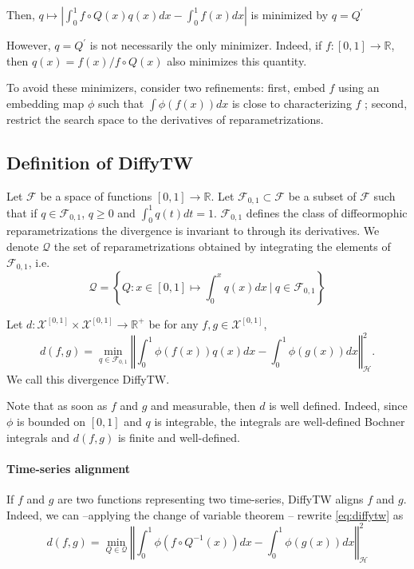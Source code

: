 Then,
$q \mapsto \left\vert\int_0^1 f\circ Q(x)q(x) dx - \int_0^1 f(x)dx\right\vert$
is minimized by $q=Q^\prime$

However, $q=Q^\prime$ is not necessarily the only minimizer. Indeed, if $f:[0,1] \to \mathbb R$, then $q(x) = f(x) / f\circ Q(x)$ also minimizes this quantity.

To avoid these minimizers, consider two refinements: first, embed $f$ using an embedding map $\phi$ such that $\int \phi(f(x))dx$ is close to characterizing $f$ ; second, restrict the search space to the derivatives of reparametrizations.

\subsection{Definition of DiffyTW}

Let $\mathcal F$ be a space of functions $[0, 1] \to \mathbb R$. Let $\mathcal F_{0,1} \subset \mathcal F$ be a subset of $\mathcal F$ such that if $q\in\mathcal F_{0,1}$, $q\geq 0$ and $\int_0^1q(t)dt =1$. $\mathcal F_{0,1}$ defines the class of diffeormophic reparametrizations the divergence is invariant to through its derivatives. We denote $\mathcal Q$ the set of reparametrizations obtained by integrating the elements of $\mathcal F_{0,1}$, i.e.
\begin{equation}
    \mathcal Q = \left\lbrace Q: x\in[0,1] \mapsto \int_0^x q(x)dx ~\vert~ q \in \mathcal F_{0,1}\right\rbrace
\end{equation}

\begin{definition}[DiffyTW]\label{def:diffytw}
Let $d: \mathcal X^{[0,1]} \times \mathcal X^{[0,1]} \to \mathbb R^+$ be for any $f, g\in\mathcal X^{[0,1]}$,
\begin{equation}\label{eq:diffytw}
    d(f, g) = \min_{q \in \mathcal F_{0,1}}\left\Vert \int_0^1 \phi(f(x))q(x)dx - \int_0^1\phi(g(x))dx\right\Vert^2_\mathcal H.
\end{equation}
We call this divergence DiffyTW.
\end{definition}

Note that as soon as $f$ and $g$ and measurable, then $d$ is well defined. Indeed, since $\phi$ is bounded on $[0,1]$ and $q$ is integrable, the integrals are well-defined Bochner integrals and $d(f, g)$ is finite and well-defined.

\paragraph{Time-series alignment}
If $f$ and $g$ are two functions representing two time-series, DiffyTW aligns $f$ and $g$. Indeed, we can --applying the change of variable theorem -- rewrite \cref{eq:diffytw} as
\begin{equation}\label{eq:diffytw-Q}
    d(f, g) = \min_{Q \in \mathcal Q} \left\Vert \int_0^1 \phi(f \circ Q^{-1}(x))dx - \int_0^1\phi(g(x))dx\right\Vert^2_\mathcal H
\end{equation}

